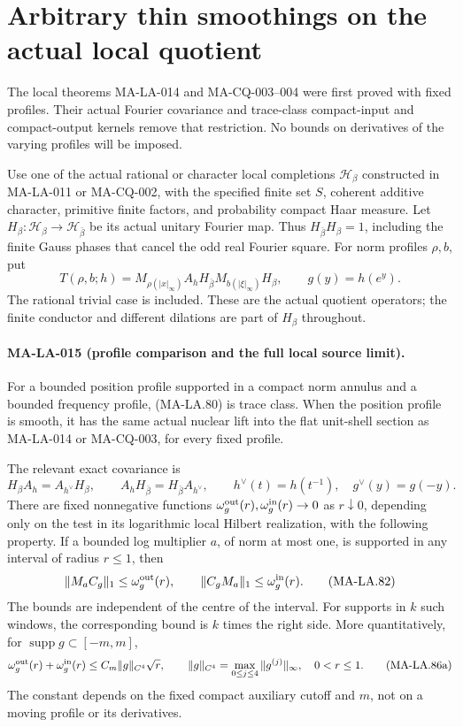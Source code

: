 \section{Arbitrary thin smoothings on the actual local quotient}
\label{sec:local-variable-profiles}

The local theorems MA-LA-014 and MA-CQ-003--004 were first
proved with fixed profiles.  Their actual Fourier covariance
and trace-class compact-input and compact-output kernels
remove that restriction.  No bounds on derivatives of the
varying profiles will be imposed.

Use one of the actual rational or character local completions
\(\mathscr H_\beta\) constructed in MA-LA-011 or MA-CQ-002,
with the specified finite set \(S\), coherent additive character,
primitive finite factors, and probability compact Haar measure.
Let \(H_\beta:\mathscr H_\beta\to\mathscr H_{\bar\beta}\)
be its actual unitary Fourier map.  Thus
\(H_{\bar\beta}H_\beta=1\), including the finite Gauss phases
that cancel the odd real Fourier square.
For norm profiles \(\rho,b\), put
\[
 T(\rho,b;h)
    =M_{\rho(|x|_\infty)}A_h
                      H_{\bar\beta}M_{b(|\xi|_\infty)}H_\beta,
 \qquad g(y)=h(e^y).
 \tag{MA-LA.80}
\]
The rational trivial case is included.  These are the actual
quotient operators; the finite conductor and different
dilations are part of \(H_\beta\) throughout.

\paragraph{MA-LA-015 (profile comparison and the full local source limit).}
For a bounded position profile supported in a compact norm
annulus and a bounded frequency profile, (MA-LA.80) is trace
class.  When the position profile is smooth, it has the same
actual nuclear lift into the flat unit-shell section as
MA-LA-014 or MA-CQ-003, for every fixed profile.

The relevant exact covariance is
\[
 H_\beta A_h=A_{h^\vee}H_\beta,\qquad
 A_hH_{\bar\beta}=H_{\bar\beta}A_{h^\vee},\qquad
 h^\vee(t)=h(t^{-1}),\quad g^\vee(y)=g(-y).
 \tag{MA-LA.81}
\]
There are fixed nonnegative functions
\(\omega_g^{\rm out}(r),\omega_g^{\rm in}(r)\to0\)
as \(r\downarrow0\), depending only on the test in its
logarithmic local Hilbert realization, with the following
property.  If a bounded log multiplier \(a\), of norm at most
one, is supported in any interval of radius \(r\le1\), then
\[
 \|M_aC_g\|_1\le\omega_g^{\rm out}(r),\qquad
 \|C_gM_a\|_1\le\omega_g^{\rm in}(r).
 \tag{MA-LA.82}
\]
The bounds are independent of the centre of the interval.
For supports in \(k\) such windows, the corresponding bound
is \(k\) times the right side.
More quantitatively, for \(\operatorname{supp}g\subset[-m,m]\),
\[
 \omega_g^{\rm out}(r)+\omega_g^{\rm in}(r)
       \le C_m\|g\|_{C^4}\sqrt r,\qquad
 \|g\|_{C^4}=\max_{0\le j\le4}\|g^{(j)}\|_\infty ,
 \quad0<r\le1 .
 \tag{MA-LA.86a}
\]
The constant depends on the fixed compact auxiliary cutoff
and \(m\), not on a moving profile or its derivatives.

